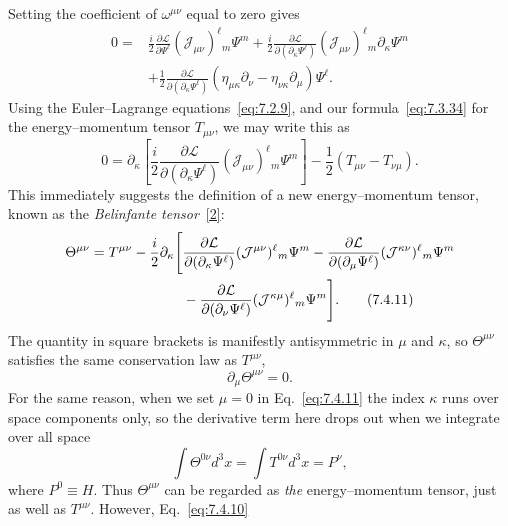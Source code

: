 Setting the coefficient of $\omega^{\mu\nu}$ equal to zero gives
\begin{align*}
0={}&\frac{i}{2}\frac{\partial\mathcal{L}}{\partial\Psi^\ell}
(\mathcal{J}_{\mu\nu})^\ell{}_m\Psi^m
+\frac{i}{2}\frac{\partial\mathcal{L}}
{\partial(\partial_\kappa\Psi^\ell)}
(\mathcal{J}_{\mu\nu})^\ell{}_m\partial_\kappa\Psi^m\\
&+\frac12\frac{\partial\mathcal{L}}
{\partial(\partial_\kappa\Psi^\ell)}
(\eta_{\mu\kappa}\partial_\nu-\eta_{\nu\kappa}\partial_\mu)\Psi^\ell.
\end{align*}
Using the Euler--Lagrange equations~\eqref{eq:7.2.9}, and our formula~\eqref{eq:7.3.34} for the
energy--momentum tensor $T_{\mu\nu}$, we may write this as
\begin{equation}
0=\partial_\kappa\left[
\frac{i}{2}\frac{\partial\mathcal{L}}
{\partial(\partial_\kappa\Psi^\ell)}
(\mathcal{J}_{\mu\nu})^\ell{}_m\Psi^m\right]
-\frac12(T_{\mu\nu}-T_{\nu\mu}).
\tag{7.4.10}\label{eq:7.4.10}
\end{equation}
This immediately suggests the definition of a new energy--momentum tensor,
known as the \emph{Belinfante tensor}~\hyperref[ref:7.2]{[2]}:
\begin{align}
\Theta^{\mu\nu}=T^{\mu\nu}-\frac{i}{2}\partial_\kappa\Bigg[&
\frac{\partial\mathcal{L}}{\partial(\partial_\kappa\Psi^\ell)}
(\mathcal{J}^{\mu\nu})^\ell{}_m\Psi^m
-\frac{\partial\mathcal{L}}{\partial(\partial_\mu\Psi^\ell)}
(\mathcal{J}^{\kappa\nu})^\ell{}_m\Psi^m\notag\\
&-\frac{\partial\mathcal{L}}{\partial(\partial_\nu\Psi^\ell)}
(\mathcal{J}^{\kappa\mu})^\ell{}_m\Psi^m\Bigg].
\tag{7.4.11}\label{eq:7.4.11}
\end{align}
The quantity in square brackets is manifestly antisymmetric in $\mu$ and
$\kappa$, so $\Theta^{\mu\nu}$ satisfies the same conservation law as
$T^{\mu\nu}$,
\begin{equation}
\partial_\mu\Theta^{\mu\nu}=0.
\tag{7.4.12}\label{eq:7.4.12}
\end{equation}
For the same reason, when we set $\mu=0$ in Eq.~\eqref{eq:7.4.11} the index $\kappa$
runs over space components only, so the derivative term here drops out when we
integrate over all space
\begin{equation}
\int\Theta^{0\nu}d^3x=\int T^{0\nu}d^3x=P^\nu,
\tag{7.4.13}\label{eq:7.4.13}
\end{equation}
where $P^0\equiv H$. Thus $\Theta^{\mu\nu}$ can be regarded as \emph{the}
energy--momentum tensor, just as well as $T^{\mu\nu}$. However, Eq.~\eqref{eq:7.4.10}
